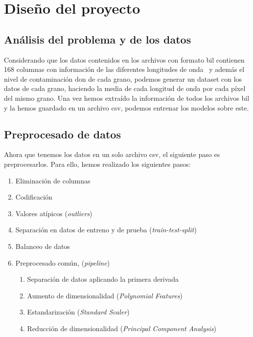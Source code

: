 \section{Diseño del proyecto}

\subsection{Análisis del problema y de los datos}\label{sec:obtencion}

Considerando que los datos contenidos en los archivos con formato \gls{bil} contienen 168 columnas con información de las diferentes longitudes de onda\ \cite{WhatIsHy18:online} y además el nivel de contaminación \gls{don} de cada grano, podemos generar un \gls{dataset} con los datos de cada grano, haciendo la media de cada longitud de onda por cada píxel del mismo grano. Una vez hemos extraído la información de todos los archivos \gls{bil} y la hemos guardado en un archivo \acrshort{csv}, podemos entrenar los modelos sobre este.

\subsection{Preprocesado de datos}\label{sec:preprocesado}

Ahora que tenemos los datos en un solo archivo \acrshort{csv}, el siguiente paso es preprocesarlos. Para ello, hemos realizado los siguientes pasos: 

\begin{enumerate}
    \item Eliminación de columnas
    \item Codificación
    \item Valores atípicos (\textit{outliers})
    \item Separación en datos de entreno y de prueba (\textit{train-test-split})
    \item Balanceo de datos
    \item Preprocesado común, (\textit{pipeline})
    \begin{enumerate}
        \item Separación de datos aplicando la primera derivada 
        \item Aumento de dimensionalidad (\textit{Polynomial Features})
        \item Estandarización  (\textit{Standard Scaler})
        \item Reducción de dimensionalidad (\textit{Principal Component Analysis})
    \end{enumerate}
    
\end{enumerate}



